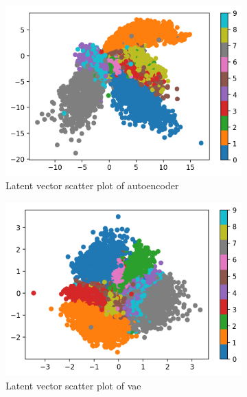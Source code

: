\documentclass[../main.tex]{subfiles}
\begin{document}
\begin{figure}[H]
	\centering
	\begin{subfigure}[b]{0.49\textwidth}
		\centering
		\includegraphics[width=\textwidth]{imgs/relatedwork/ae-latentvector}
		\caption{Latent vector scatter plot of autoencoder}
		\label{fig:y equals x}
	\end{subfigure}
	\hfill
	\begin{subfigure}[b]{0.49\textwidth}
		\centering
		\includegraphics[width=\textwidth]{imgs/relatedwork/vae-latentvector}
		\caption{Latent vector scatter plot of \gls{vae}}
		\label{fig:three sin x}
	\end{subfigure}
	\\
	\begin{subfigure}[b]{0.49\textwidth}

\end{subfigure}
\end{figure}
\end{document}
